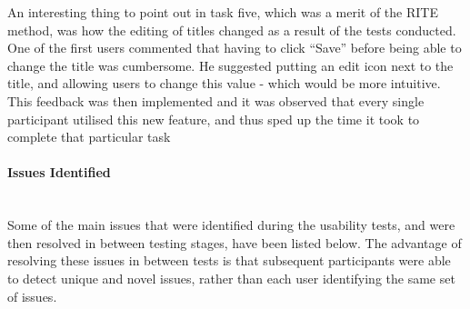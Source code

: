 \newpage
\noindent
An interesting thing to point out in task five, which was a merit of the RITE method, was how the editing of titles changed as a result of the tests conducted. One of the first users commented that having to click ``Save'' before being able to change the title was cumbersome. He suggested putting an edit icon next to the title, and allowing users to change this value - which would be more intuitive. This feedback was then implemented and it was observed that every single participant utilised this new feature, and thus sped up the time it took to complete that particular task

\paragraph{Issues Identified}\ \\
Some of the main issues that were identified during the usability tests, and were then resolved in between testing stages, have been listed below. The advantage of resolving these issues in between tests is that subsequent participants were able to detect unique and novel issues, rather than each user identifying the same set of issues.
\ \\
\ \\
\noindent 
